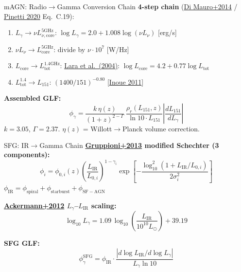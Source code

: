 \begin{frame}{mAGN: Radio$\to$Gamma Conversion Chain}
\textbf{4-step chain} (\href{https://arxiv.org/abs/1304.0908}{Di Mauro+2014} / \href{https://arxiv.org/abs/1911.04989}{Pinetti 2020} Eq.~C.19):
\begin{enumerate}
    \item $L_\gamma \to \nu L_{\nu,\mathrm{core}}^{5\mathrm{GHz}}$: \quad $\log L_\gamma = 2.0 + 1.008\log(\nu L_\nu)$ [erg/s]
    \item $\nu L_\nu \to L_{\mathrm{core}}^{5\mathrm{GHz}}$: \quad divide by $\nu\cdot 10^7$ [W/Hz]
    \item $L_{\mathrm{core}} \to L_{\mathrm{tot}}^{1.4\mathrm{GHz}}$: \quad \href{https://arxiv.org/abs/astro-ph/0404373}{Lara et al.\ (2004)}: $\log L_{\mathrm{core}} = 4.2 + 0.77\log L_{\mathrm{tot}}$
    \item $L_{\mathrm{tot}}^{1.4} \to L_{151}$: \quad $(1400/151)^{-0.80}$ [\href{https://arxiv.org/abs/1103.3946}{Inoue 2011}]
\end{enumerate}

\textbf{Assembled GLF:}
\begin{equation}
\phi_\gamma = \frac{k\,\eta(z)}{(1+z)^{2-\Gamma}}\,\frac{\rho_r(L_{151},z)}{\ln 10\cdot L_{151}}\left|\frac{dL_{151}}{dL_\gamma}\right|
\end{equation}
$k = 3.05$, $\Gamma = 2.37$. \quad $\eta(z)$ = Willott$\to$Planck volume correction.
\end{frame}

\begin{frame}{SFG: IR$\to$Gamma Chain}
\textbf{\href{https://arxiv.org/abs/1302.5209}{Gruppioni+2013} modified Schechter (3 components):}
\begin{equation}
\phi_i = \phi_{0,i}(z)\left(\frac{L_{\mathrm{IR}}}{L_{0,i}}\right)^{\!1-\gamma_i}\!\exp\!\left[-\frac{\log_{10}^2(1+L_{\mathrm{IR}}/L_{0,i})}{2\sigma_i^2}\right]
\end{equation}
$\phi_{\mathrm{IR}} = \phi_{\mathrm{spiral}} + \phi_{\mathrm{starburst}} + \phi_{\mathrm{SF-AGN}}$

\vspace{0.3cm}
\textbf{\href{https://arxiv.org/abs/1206.1346}{Ackermann+2012} $L_\gamma$--$L_{\mathrm{IR}}$ scaling:}
\begin{equation}
\log_{10} L_\gamma = 1.09\,\log_{10}\!\left(\frac{L_{\mathrm{IR}}}{10^{10}L_\odot}\right) + 39.19
\end{equation}

\textbf{SFG GLF:}
\begin{equation}
\phi_\gamma^{\mathrm{SFG}} = \phi_{\mathrm{IR}}\cdot\frac{|d\log L_{\mathrm{IR}}/d\log L_\gamma|}{L_\gamma\ln 10}
\end{equation}
\end{frame}

